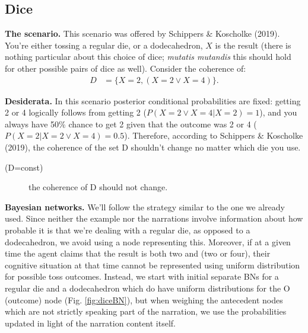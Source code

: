 \documentclass[
  10pt,
]{scrartcl}
\newcommand{\s}[1]{\textsf{#1}}
\begin{document}
\hypertarget{dice}{%
\subsection{Dice}\label{dice}}

\textbf{The scenario.} This scenario was offered by Schippers \& Koscholke (2019). You're either tossing a regular die, or a dodecahedron, \(X\) is the result (there is nothing particular about this choice of dice; \emph{mutatis mutandis} this should hold for other possible pairs of dice as well). Consider the coherence of:
\begin{align*} D &= \{X=2, (X=2\vee X=4)\}.\end{align*}

\noindent \textbf{Desiderata.} In this scenario posterior conditional probabilities are fixed: getting 2 or 4 logically follows from getting 2 (\(P(X=2\vee X=4|X=2)=1\)), and you always have 50\% chance to get 2 given that the outcome was 2 or 4 (\(P(X=2|X=2\vee X=4)=0.5\)). Therefore, according to Schippers \& Koscholke (2019), the coherence of the set \s{D} shouldn't change no matter which die you use.

\vspace{2mm}\begin{description}
    \item[(\s{D=const})] the coherence of \s{D} should not change.
\end{description}\vspace{2mm}


\textbf{Bayesian networks.} We'll follow the strategy similar to the one we already used. Since neither the example nor the narrations involve information about how probable it is that we're dealing with a regular die, as opposed to a dodecahedron, we avoid using a node representing this. Moreover, if at a given time the agent claims that the result is both two and (two or four), their cognitive situation at that time cannot be represented using uniform distribution for possible toss outcomes. Instead, we start with initial separate BNs for a regular die and a dodecahedron which do have uniform distributions for the \textsf{O} (outcome) node (Fig. \ref{fig:diceBN}), but when weighing the antecedent nodes which are not strictly speaking part of the narration, we use the probabilities updated in light of the narration content itself.
\end{document}
